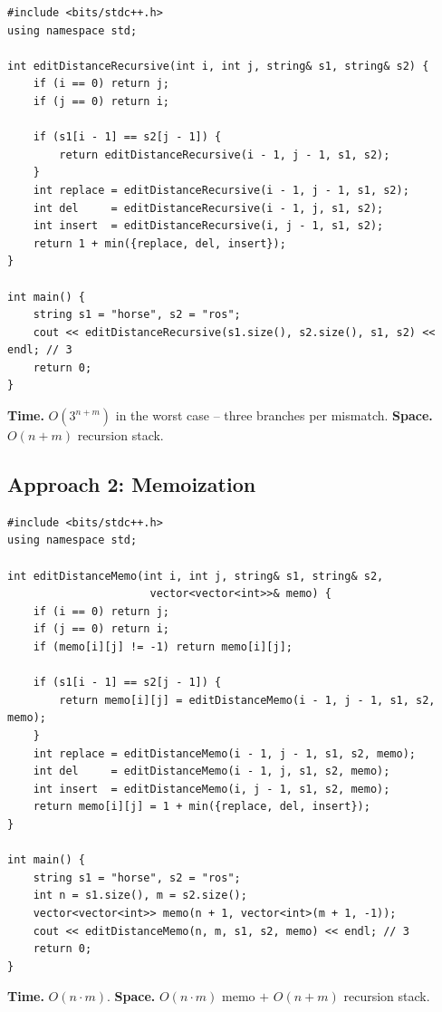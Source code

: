 \begin{lstlisting}
#include <bits/stdc++.h>
using namespace std;

int editDistanceRecursive(int i, int j, string& s1, string& s2) {
    if (i == 0) return j;
    if (j == 0) return i;

    if (s1[i - 1] == s2[j - 1]) {
        return editDistanceRecursive(i - 1, j - 1, s1, s2);
    }
    int replace = editDistanceRecursive(i - 1, j - 1, s1, s2);
    int del     = editDistanceRecursive(i - 1, j, s1, s2);
    int insert  = editDistanceRecursive(i, j - 1, s1, s2);
    return 1 + min({replace, del, insert});
}

int main() {
    string s1 = "horse", s2 = "ros";
    cout << editDistanceRecursive(s1.size(), s2.size(), s1, s2) << endl; // 3
    return 0;
}
\end{lstlisting}

\begin{complexitybox}
\textbf{Time.} $O(3^{n+m})$ in the worst case -- three branches per
mismatch.
\textbf{Space.} $O(n+m)$ recursion stack.
\end{complexitybox}

\subsection*{Approach 2: Memoization}

\begin{lstlisting}
#include <bits/stdc++.h>
using namespace std;

int editDistanceMemo(int i, int j, string& s1, string& s2,
                      vector<vector<int>>& memo) {
    if (i == 0) return j;
    if (j == 0) return i;
    if (memo[i][j] != -1) return memo[i][j];

    if (s1[i - 1] == s2[j - 1]) {
        return memo[i][j] = editDistanceMemo(i - 1, j - 1, s1, s2, memo);
    }
    int replace = editDistanceMemo(i - 1, j - 1, s1, s2, memo);
    int del     = editDistanceMemo(i - 1, j, s1, s2, memo);
    int insert  = editDistanceMemo(i, j - 1, s1, s2, memo);
    return memo[i][j] = 1 + min({replace, del, insert});
}

int main() {
    string s1 = "horse", s2 = "ros";
    int n = s1.size(), m = s2.size();
    vector<vector<int>> memo(n + 1, vector<int>(m + 1, -1));
    cout << editDistanceMemo(n, m, s1, s2, memo) << endl; // 3
    return 0;
}
\end{lstlisting}

\begin{complexitybox}
\textbf{Time.} $O(n \cdot m)$.
\textbf{Space.} $O(n \cdot m)$ memo $+$ $O(n+m)$ recursion stack.
\end{complexitybox}

